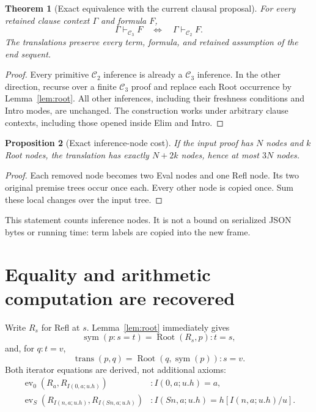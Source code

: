 \documentclass[11pt]{article}
\newtheorem{theorem}{Theorem}[section]
\newtheorem{proposition}[theorem]{Proposition}
\theoremstyle{definition}\newtheorem{definition}[theorem]{Definition}
\newcommand{\Ctwo}{\mathcal C_2}
\newcommand{\Cthree}{\mathcal C_3}
\newcommand{\ev}{\operatorname{ev}}
\newcommand{\Root}{\operatorname{Root}}
\begin{document}
\begin{theorem}[Exact equivalence with the current clausal proposal]
For every retained clause context $\Gamma$ and formula $F$,
\[
       \Gamma\vdash_{\Cthree}F
       \quad\Longleftrightarrow\quad
       \Gamma\vdash_{\Ctwo}F.
\]
The translations preserve every term, formula, and retained assumption
of the end sequent.
\end{theorem}
\begin{proof}
Every primitive $\Ctwo$ inference is already a $\Cthree$ inference.
In the other direction, recurse over a finite $\Cthree$ proof and
replace each Root occurrence by Lemma~\ref{lem:root}. All other
inferences, including their freshness conditions and Intro modes,
are unchanged. The construction works under arbitrary clause
contexts, including those opened inside Elim and Intro.
\end{proof}

\begin{proposition}[Exact inference-node cost]
If the input proof has $N$ nodes and $k$ Root nodes, the translation
has exactly $N+2k$ nodes, hence at most $3N$ nodes.
\end{proposition}
\begin{proof}
Each removed node becomes two Eval nodes and one Refl node. Its two
original premise trees occur once each. Every other node is copied
once. Sum these local changes over the input tree.
\end{proof}
This statement counts inference nodes. It is not a bound on serialized
JSON bytes or running time: term labels are copied into the new frame.

\section{Equality and arithmetic computation are recovered}

Write $R_s$ for Refl at $s$. Lemma~\ref{lem:root} immediately gives
\[
 \operatorname{sym}(p:s=t)=\Root(R_s,p):t=s,
\]
and, for $q:t=v$,
\[
 \operatorname{trans}(p,q)=\Root(q,\operatorname{sym}(p)):s=v.
\]
Both iterator equations are derived, not additional axioms:
\begin{align*}
 \ev_0(R_a,R_{I(0,a;u.h)})
      &:I(0,a;u.h)=a,\\
 \ev_S(R_{I(n,a;u.h)},R_{I(Sn,a;u.h)})
      &:I(Sn,a;u.h)=h[I(n,a;u.h)/u].
\end{align*}
\end{document}
